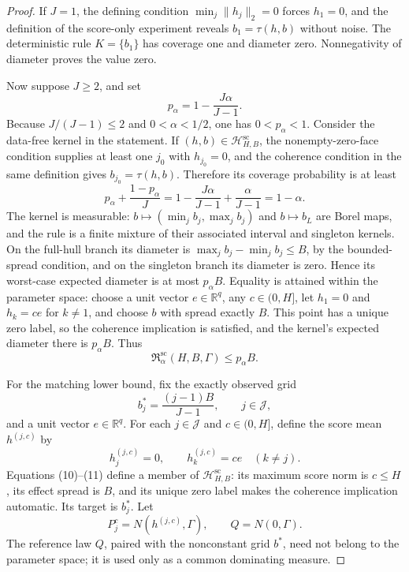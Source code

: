 \documentclass{article}
\begin{document}
\begin{proof}
If \(J=1\), the defining condition \(\min_j\lVert h_j\rVert_2=0\) forces \(h_1=0\), and the definition of the score-only experiment reveals \(b_1=\tau(h,b)\) without noise. The deterministic rule \(K=\{b_1\}\) has coverage one and diameter zero. Nonnegativity of diameter proves the value zero.

Now suppose \(J\geq2\), and set
\[
 p_\alpha=1-\frac{J\alpha}{J-1}.
\]
Because \(J/(J-1)\leq2\) and \(0<\alpha<1/2\), one has \(0<p_\alpha<1\). Consider the data-free kernel in the statement. If \((h,b)\in\mathcal H_{H,B}^{\mathrm{sc}}\), the nonempty-zero-face condition supplies at least one \(j_0\) with \(h_{j_0}=0\), and the coherence condition in the same definition gives \(b_{j_0}=\tau(h,b)\). Therefore its coverage probability is at least
\[
 p_\alpha+\frac{1-p_\alpha}{J}
 =1-\frac{J\alpha}{J-1}+\frac{\alpha}{J-1}
 =1-\alpha.
 \tag{8}
\]
The kernel is measurable: \(b\mapsto(\min_j b_j,\max_j b_j)\) and \(b\mapsto b_L\) are Borel maps, and the rule is a finite mixture of their associated interval and singleton kernels.
On the full-hull branch its diameter is \(\max_j b_j-\min_j b_j\leq B\), by the bounded-spread condition, and on the singleton branch its diameter is zero. Hence its worst-case expected diameter is at most \(p_\alpha B\). Equality is attained within the parameter space: choose a unit vector \(e\in\mathbb R^q\), any \(c\in(0,H]\), let \(h_1=0\) and \(h_k=ce\) for \(k\neq1\), and choose \(b\) with spread exactly \(B\). This point has a unique zero label, so the coherence implication is satisfied, and the kernel's expected diameter there is \(p_\alpha B\). Thus
\[
 \mathfrak R_{\alpha}^{\mathrm{sc}}(H,B,\Gamma)\leq p_\alpha B.
 \tag{9}
\]

For the matching lower bound, fix the exactly observed grid
\[
 b_j^*=\frac{(j-1)B}{J-1},\qquad j\in\mathcal J,
 \tag{10}
\]
and a unit vector \(e\in\mathbb R^q\). For each \(j\in\mathcal J\) and \(c\in(0,H]\), define the score mean \(h^{(j,c)}\) by
\[
 h_j^{(j,c)}=0,
 \qquad
 h_k^{(j,c)}=ce\quad(k\neq j).
 \tag{11}
\]
Equations (10)--(11) define a member of \(\mathcal H_{H,B}^{\mathrm{sc}}\): its maximum score norm is \(c\leq H\), its effect spread is \(B\), and its unique zero label makes the coherence implication automatic. Its target is \(b_j^*\). Let
\[
 P_j^c=N(h^{(j,c)},\Gamma),
 \qquad
 Q=N(0,\Gamma).
\]
The reference law \(Q\), paired with the nonconstant grid \(b^*\), need not belong to the parameter space; it is used only as a common dominating measure.


\end{proof}
\end{document}
